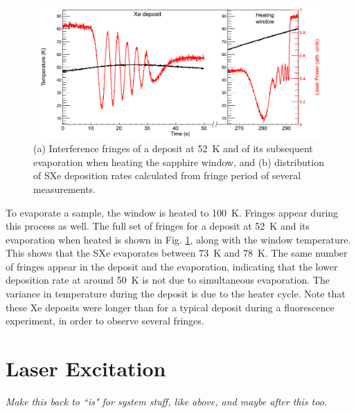 \begin{figure} %
        \centering
                \includegraphics[width=.9\textwidth]{figures/fringes_dep_and_melt.png}
                \caption{(a) Interference fringes of a deposit at 52~K and of its subsequent evaporation when heating the sapphire window, and (b) distribution of SXe deposition rates calculated from fringe period of several measurements.}
\label{fig:fringes_melt_withDep}
\end{figure}

To evaporate a sample, the window is heated to 100~K.  Fringes appear during this process as well.  The full set of fringes for a deposit at 52~K and its evaporation when heated is shown in Fig. \ref{fig:fringes_melt_withDep}, along with the window temperature.  This shows that the SXe evaporates between 73~K and 78~K.  The same number of fringes appear in the deposit and the evaporation, indicating that the lower deposition rate at around 50~K is not due to simultaneous evaporation.  The variance in temperature during the deposit is due to the heater cycle.  Note that these Xe deposits were longer than for a typical deposit during a fluorescence experiment, in order to observe several fringes.


\section{Laser Excitation}

\emph{\color{gray}Make this back to ``is" for system stuff, like above, and maybe after this too.}

